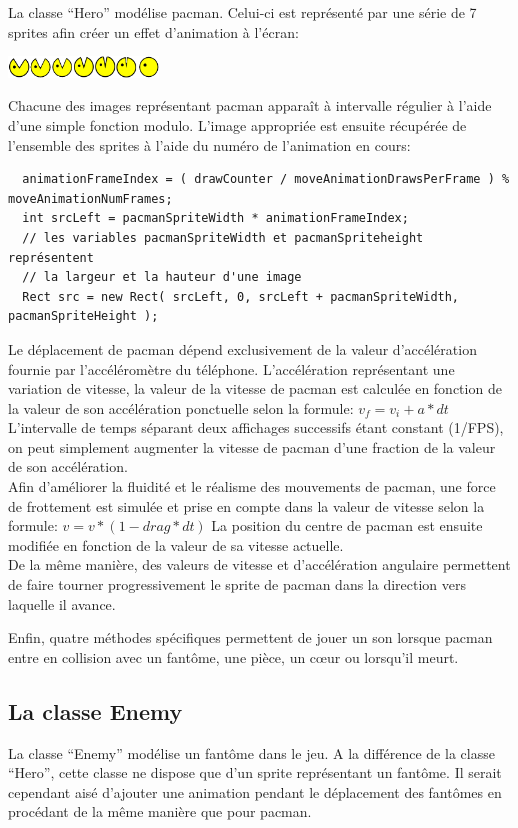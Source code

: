 \documentclass{article}
\begin{document}
La classe \enquote{Hero} modélise pacman. 
Celui-ci est représenté par une série de 7 sprites afin créer un effet d'animation à l'écran:
\begin{center}
  \includegraphics[width=4cm]{pacman_sprites.png}
\end{center}
Chacune des images représentant pacman apparaît à intervalle régulier à l'aide d'une simple fonction modulo.
L'image appropriée est ensuite récupérée de l'ensemble des sprites à l'aide du numéro de l'animation en cours:
\begin{verbatim}
  animationFrameIndex = ( drawCounter / moveAnimationDrawsPerFrame ) % moveAnimationNumFrames;
  int srcLeft = pacmanSpriteWidth * animationFrameIndex;
  // les variables pacmanSpriteWidth et pacmanSpriteheight représentent 
  // la largeur et la hauteur d'une image
  Rect src = new Rect( srcLeft, 0, srcLeft + pacmanSpriteWidth, pacmanSpriteHeight );
\end{verbatim}
Le déplacement de pacman dépend exclusivement de la valeur d'accélération fournie par l'accéléromètre du téléphone.
L'accélération représentant une variation de vitesse, la valeur de la vitesse de pacman est calculée en fonction de la valeur de son accélération ponctuelle selon la formule:
$ v_f = v_i + a*dt $
L'intervalle de temps séparant deux affichages successifs étant constant (1/FPS), on peut simplement augmenter la vitesse de pacman d'une fraction de la valeur de son accélération.\\

Afin d'améliorer la fluidité et le réalisme des mouvements de pacman, une force de frottement est simulée et prise en compte dans la valeur de vitesse selon la formule: $v = v * ( 1 - drag * dt)$ 
La position du centre de pacman est ensuite modifiée en fonction de la valeur de sa vitesse actuelle.\\

De la même manière, des valeurs de vitesse et d'accélération angulaire permettent de faire tourner progressivement le sprite de pacman dans la direction vers laquelle il avance.

Enfin, quatre méthodes spécifiques permettent de jouer un son lorsque pacman entre en collision avec un fantôme, une pièce, un cœur ou lorsqu'il meurt.

\subsection{La classe Enemy}
La classe \enquote{Enemy} modélise un fantôme dans le jeu.
A la différence de la classe \enquote{Hero}, cette classe ne dispose que d'un sprite représentant un fantôme.
Il serait cependant aisé d'ajouter une animation pendant le déplacement des fantômes en procédant de la même manière que pour pacman.\\
\end{document}
